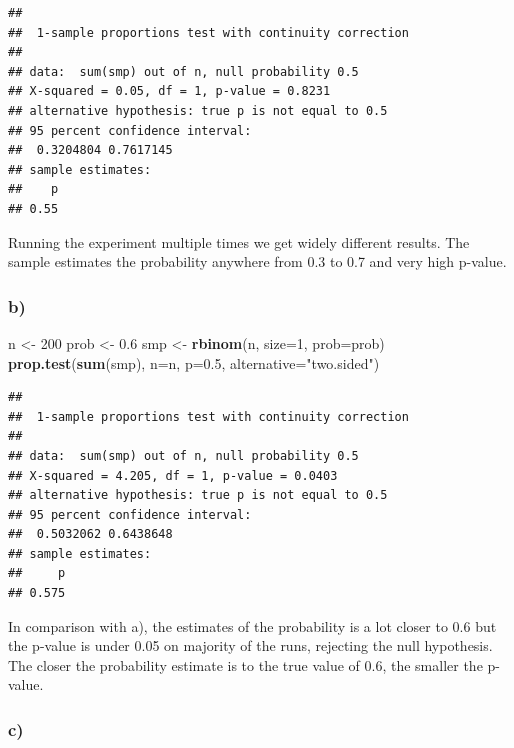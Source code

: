 \documentclass[
]{article}
\newenvironment{Shaded}{\begin{snugshade}}{\end{snugshade}}
\newcommand{\AttributeTok}[1]{\textcolor[rgb]{0.13,0.29,0.53}{#1}}
\newcommand{\DecValTok}[1]{\textcolor[rgb]{0.00,0.00,0.81}{#1}}
\newcommand{\FloatTok}[1]{\textcolor[rgb]{0.00,0.00,0.81}{#1}}
\newcommand{\FunctionTok}[1]{\textcolor[rgb]{0.13,0.29,0.53}{\textbf{#1}}}
\newcommand{\NormalTok}[1]{#1}
\newcommand{\OtherTok}[1]{\textcolor[rgb]{0.56,0.35,0.01}{#1}}
\newcommand{\StringTok}[1]{\textcolor[rgb]{0.31,0.60,0.02}{#1}}
\begin{document}
\begin{verbatim}
## 
##  1-sample proportions test with continuity correction
## 
## data:  sum(smp) out of n, null probability 0.5
## X-squared = 0.05, df = 1, p-value = 0.8231
## alternative hypothesis: true p is not equal to 0.5
## 95 percent confidence interval:
##  0.3204804 0.7617145
## sample estimates:
##    p 
## 0.55
\end{verbatim}

Running the experiment multiple times we get widely different results.
The sample estimates the probability anywhere from 0.3 to 0.7 and very
high p-value.

\subsubsection{b)}\label{b}

\begin{Shaded}
\begin{Highlighting}[]
\NormalTok{n }\OtherTok{\textless{}{-}} \DecValTok{200}
\NormalTok{prob }\OtherTok{\textless{}{-}} \FloatTok{0.6}
\NormalTok{smp }\OtherTok{\textless{}{-}} \FunctionTok{rbinom}\NormalTok{(n, }\AttributeTok{size=}\DecValTok{1}\NormalTok{, }\AttributeTok{prob=}\NormalTok{prob)}
\FunctionTok{prop.test}\NormalTok{(}\FunctionTok{sum}\NormalTok{(smp), }\AttributeTok{n=}\NormalTok{n, }\AttributeTok{p=}\FloatTok{0.5}\NormalTok{, }\AttributeTok{alternative=}\StringTok{"two.sided"}\NormalTok{)}
\end{Highlighting}
\end{Shaded}

\begin{verbatim}
## 
##  1-sample proportions test with continuity correction
## 
## data:  sum(smp) out of n, null probability 0.5
## X-squared = 4.205, df = 1, p-value = 0.0403
## alternative hypothesis: true p is not equal to 0.5
## 95 percent confidence interval:
##  0.5032062 0.6438648
## sample estimates:
##     p 
## 0.575
\end{verbatim}

In comparison with a), the estimates of the probability is a lot closer
to 0.6 but the p-value is under 0.05 on majority of the runs, rejecting
the null hypothesis. The closer the probability estimate is to the true
value of 0.6, the smaller the p-value.

\subsubsection{c)}\label{c}
\end{document}
